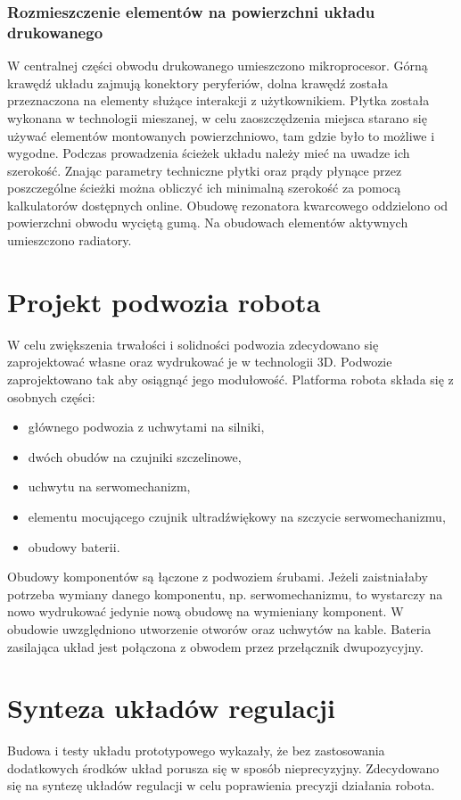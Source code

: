 \documentclass[11pt]{article}
\begin{document}
\subsubsection{Rozmieszczenie elementów na powierzchni układu drukowanego}
W centralnej części obwodu drukowanego umieszczono mikroprocesor.
Górną krawędź układu zajmują konektory peryferiów, dolna krawędź została przeznaczona na elementy służące interakcji z użytkownikiem.
Płytka została wykonana w technologii mieszanej, w celu zaoszczędzenia miejsca starano się używać elementów montowanych powierzchniowo, tam gdzie było to możliwe i wygodne.
Podczas prowadzenia ścieżek układu należy mieć na uwadze ich szerokość.
Znając parametry techniczne płytki oraz prądy płynące przez poszczególne ścieżki można obliczyć ich minimalną szerokość za pomocą kalkulatorów dostępnych online. %
Obudowę rezonatora kwarcowego oddzielono od powierzchni obwodu wyciętą gumą.
Na obudowach elementów aktywnych umieszczono radiatory.

\section{Projekt podwozia robota}
W celu zwiększenia trwałości i solidności podwozia zdecydowano się zaprojektować własne oraz wydrukować je w technologii 3D.
Podwozie zaprojektowano tak aby osiągnąć jego modułowość.
Platforma robota składa się z osobnych części:
\begin{itemize}
	\item głównego podwozia z uchwytami na silniki,
	\item dwóch obudów na czujniki szczelinowe,
	\item uchwytu na serwomechanizm,
	\item elementu mocującego czujnik ultradźwiękowy na szczycie serwomechanizmu,
	\item obudowy baterii.
\end{itemize}
Obudowy komponentów są łączone z podwoziem śrubami. Jeżeli zaistniałaby potrzeba wymiany danego komponentu, np. serwomechanizmu, to wystarczy na nowo wydrukować jedynie nową obudowę na wymieniany komponent.
W obudowie uwzględniono utworzenie otworów oraz uchwytów na kable.
Bateria zasilająca układ jest połączona z obwodem przez przełącznik dwupozycyjny.

\section{Synteza układów regulacji}
Budowa i testy układu prototypowego wykazały, że bez zastosowania dodatkowych środków układ porusza się w sposób nieprecyzyjny.
Zdecydowano się na syntezę układów regulacji w celu poprawienia precyzji działania robota.
\end{document}
